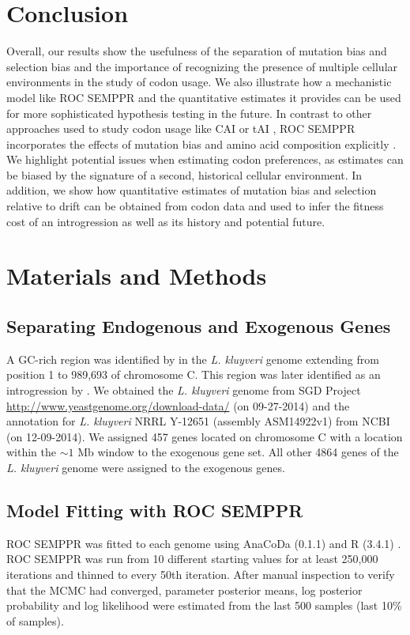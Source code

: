 \documentclass[doublespacing,linenumbers]{bmcart-modified}
\newcommand{\kluyveri}{\textit{L. kluyveri}\xspace}
\newcommand{\ROC}{ROC SEMPPR\xspace}
\begin{document}
\section*{Conclusion}
Overall, our results show the usefulness of the separation of mutation bias and selection bias and the importance of recognizing the presence of multiple cellular environments in the study of codon usage.
We also illustrate how a mechanistic model like \ROC and the quantitative estimates it provides can be used for more sophisticated hypothesis testing in the future.
In contrast to other approaches used to study codon usage like CAI \citep{sharp1987} or tAI \citep{dosreis2004}, \ROC incorporates the effects of mutation bias and amino acid composition explicitly \citep{cope2018}.
We highlight potential issues when estimating codon preferences, as estimates can be biased by the signature of a second, historical cellular environment.
In addition, we show how quantitative estimates of mutation bias and selection relative to drift can be obtained from codon data and used to infer the fitness cost of an introgression as well as its history and potential future.

\section*{Materials and Methods}

\subsection*{Separating Endogenous and Exogenous Genes}
A GC-rich region was identified by \cite{payen2009} in the \kluyveri genome extending from position 1 to 989,693 of chromosome C.
This region was later identified as an introgression by \cite{friedrich2015}.
We obtained the \kluyveri genome from SGD Project \url{http://www.yeastgenome.org/download-data/} (on 09-27-2014) and the annotation for \kluyveri NRRL Y-12651 (assembly ASM14922v1) from NCBI (on 12-09-2014).
We assigned 457 genes located on chromosome C with a location within the $\sim 1$ Mb window to the exogenous gene set.
All other 4864 genes of the \kluyveri genome were assigned to the exogenous genes.

\subsection*{Model Fitting with \ROC}
\ROC was fitted to each genome using AnaCoDa (0.1.1) \citep{landerer2018} and R (3.4.1) \citep{rcore}.
\ROC was run from 10 different starting values for at least 250,000 iterations and thinned to every 50th iteration.
After manual inspection to verify that the MCMC had converged, parameter posterior means, log posterior probability and log likelihood were estimated from the last 500 samples (last 10\% of samples).
\end{document}
